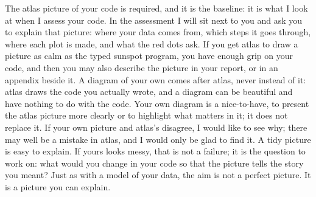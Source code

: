 \documentclass[12pt, a4paper]{article}
\theoremstyle{definition}
\theoremstyle{remark}
\begin{document}
The atlas picture of your code is required, and it is the baseline: it is what I look at when I assess your code. In the assessment I will sit next to you and ask you to explain that picture: where your data comes from, which steps it goes through, where each plot is made, and what the red dots ask. If you get atlas to draw a picture as calm as the typed sunspot program, you have enough grip on your code, and then you may also describe the picture in your report, or in an appendix beside it. A diagram of your own comes after atlas, never instead of it: atlas draws the code you actually wrote, and a diagram can be beautiful and have nothing to do with the code. Your own diagram is a nice-to-have, to present the atlas picture more clearly or to highlight what matters in it; it does not replace it. If your own picture and atlas's disagree, I would like to see why; there may well be a mistake in atlas, and I would only be glad to find it. A tidy picture is easy to explain. If yours looks messy, that is not a failure; it is the question to work on: what would you change in your code so that the picture tells the story you meant? Just as with a model of your data, the aim is not a perfect picture. It is a picture you can explain.
\end{document}
